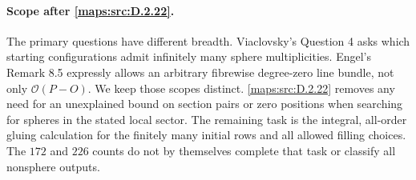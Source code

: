 \paragraph{Scope after \ref{maps:src:D.2.22}.}
The primary questions have different breadth. Viaclovsky's
Question 4 \cite[Section 1.1]{manViaclovskyLogs26} asks which starting configurations admit infinitely
many sphere multiplicities. Engel's Remark 8.5 \cite{manEngel26} expressly allows
an arbitrary fibrewise degree-zero line bundle, not only
$\mathcal O(P-O)$. We keep those scopes distinct. \ref{maps:src:D.2.22} removes
any need for an unexplained bound on section pairs or zero
positions when searching for spheres in the stated local sector.
The remaining task is the integral, all-order gluing calculation
for the finitely many initial rows and all allowed filling choices.
The $172$ and $226$ counts do not by themselves complete that task
or classify all nonsphere outputs.


